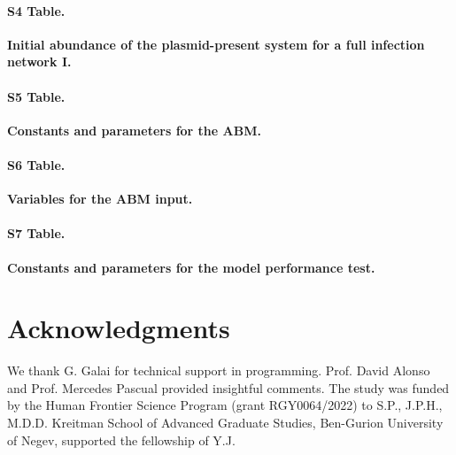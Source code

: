 \documentclass[10pt,letterpaper]{article}
\begin{document}
\paragraph*{S4 Table.}
\label{S4_Table}
{\bf Initial abundance of the plasmid-present system for a full infection network \textbf{I}.}

\paragraph*{S5 Table.}
\label{S5_Table}
{\bf Constants and parameters for the ABM.}

\paragraph*{S6 Table.}
\label{S6_Table}
{\bf Variables for the ABM input.}

\paragraph*{S7 Table.}
\label{S7_Table}
{\bf Constants and parameters for the model performance test.}

\section*{Acknowledgments}
We thank G. Galai for technical support in programming. Prof. David Alonso and Prof. Mercedes Pascual provided insightful comments. The study was funded by the Human Frontier Science Program (grant RGY0064/2022) to S.P., J.P.H., M.D.D. Kreitman School of Advanced Graduate Studies, Ben-Gurion University of Negev, supported the fellowship of Y.J.

\nolinenumbers

%

\end{document}
